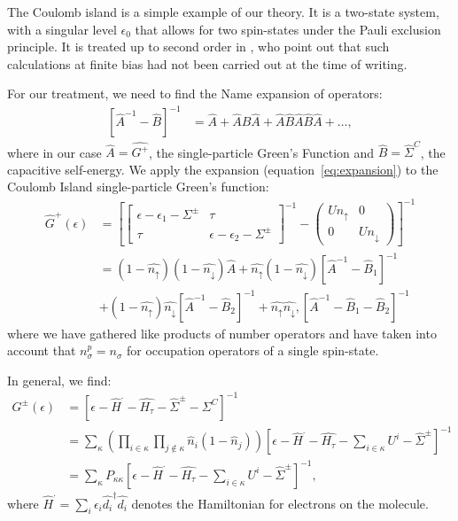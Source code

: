 \documentclass{article}
\newcommand{\red}[1]{ {\color{red} #1}}
\begin{document}
\begin{multicols}{2}
        The Coulomb island is a simple example of our theory. It is a two-state system, with a singular level $\epsilon_0$ that allows for two spin-states under the Pauli exclusion principle. It is treated up to second order in \citet{haugjauho}, who point out that such calculations at finite bias had not been carried out at the time of writing. 
        
        For our treatment, we need to find the \red{Name} expansion of \red{operators}:
        \begin{align}
        \left[ \hat{A}^{-1} - \hat{B}\right]^{-1} &=\hat{A} + \hat{A}\hat{B}\hat{A} + \hat{A}\hat{B}\hat{A}\hat{B}\hat{A} + \ldots,
        \label{eq:expansion}\end{align}
        where in our case $\hat{A} = \hat{G^+}$, the single-particle Green's Function and $\hat{B}=\hat{\Sigma}^C$, the capacitive self-energy. We apply the expansion (equation~\ref{eq:expansion}) to the Coulomb Island single-particle Green's function:
        \begin{align*}
            \hat{G}^+(\epsilon) &= \left[ \begin{bmatrix} \epsilon - \epsilon_1 - \Sigma^\pm & \tau \\
\tau & \epsilon - \epsilon_2 - \Sigma^\pm \end{bmatrix}^{-1} - \begin{pmatrix} U n_\uparrow & 0 \\ 0 & U n_\downarrow \end{pmatrix} \right]^{-1} \\
            &= (1-\hat{n_\uparrow})(1-\hat{n_\downarrow}) \hat{A} + \hat{n_\uparrow} (1-\hat{n_\downarrow}) \left[ \hat{A}^{-1} - \hat{B}_1\right]^{-1} \\& + (1-\hat{n_\uparrow}) \hat{n_\downarrow} \left[ \hat{A}^{-1} - \hat{B}_2\right]^{-1} + \hat{n_\uparrow} \hat{n_\downarrow}, \left[\hat{A}^{-1} - \hat{B}_1 - \hat{B}_2 \right]^{-1}
        \end{align*}
        where we have gathered like products of number operators and have taken into account that $ n_\sigma^p = n_\sigma$ for occupation operators of a single spin-state.
        
        In general, we find:
        \begin{align}
        G^\pm(\epsilon) &= \left[ \epsilon - \hat{H}^\cdot - \hat{H_\tau} -\hat{\Sigma}^{\pm} - \Sigma^{C} \right]^{-1} \nonumber\\
        &= \sum_\kappa \left( \prod_{i\in\kappa} \prod_{j\notin\kappa} \hat{n}_i (1-\hat{n}_j) \right) \left[ \epsilon - \hat{H}^\cdot - \hat{H_\tau} - \sum_{i \in \kappa}U^i - \hat{\Sigma}^\pm \right]^{-1} \nonumber\\
        &= \sum_\kappa P_{\kappa\kappa} \left[\epsilon - \hat{H}^\cdot - \hat{H_\tau} - \sum_{i\in\kappa} U^i - \hat{\Sigma}^\pm \right]^{-1} \label{eq:grouping},
        \end{align} 
        where $\hat{H}^\cdot=\sum_i \epsilon_i \hat{d_i}^\dagger \hat{d_i}$ denotes the Hamiltonian for electrons on the molecule.
        

\end{multicols}
\end{document}
